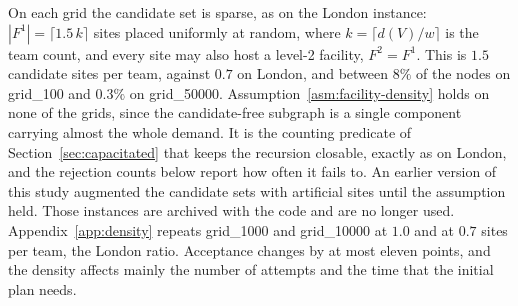 \documentclass[preprint,12pt,authoryear]{elsarticle}
\theoremstyle{definition}
\begin{document}
On each grid the candidate set is sparse, as on the London instance: 
$|F^1| = \lceil 1.5\,k \rceil$ sites placed uniformly at random, where 
$k = \lceil d(V)/w \rceil$ is the team count, and every site may also 
host a level-2 facility, $F^2 = F^1$. This is $1.5$ candidate sites per 
team, against $0.7$ on London, and between $8\%$ of the nodes on grid\_100 
and $0.3\%$ on grid\_50000. Assumption~\ref{asm:facility-density} holds on 
none of the grids, since the candidate-free subgraph is a single component 
carrying almost the whole demand. It is the counting predicate of 
Section~\ref{sec:capacitated} that keeps the recursion closable, exactly as 
on London, and the rejection counts below report how often it fails to. An 
earlier version of this study augmented the candidate sets with artificial 
sites until the assumption held. Those instances are archived with the code 
and are no longer used. Appendix~\ref{app:density} repeats grid\_1000 and grid\_10000 at $1.0$ and at $0.7$ sites per team, the London ratio. Acceptance changes by at most eleven points, and the density affects mainly the number of attempts and the time that the initial plan needs.
\end{document}
